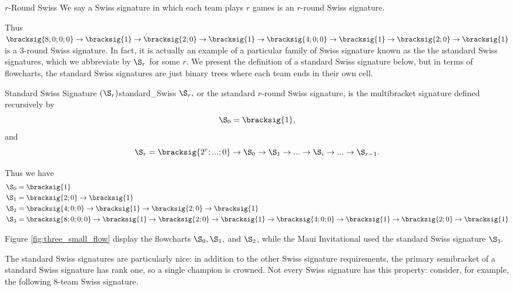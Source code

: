 {    \begin{definition}{$r$-Round Swiss}{}
        We say a Swiss signature in which each team plays $r$ games is an $r$-round Swiss signature.
    \end{definition}
    
    Thus $\bracksig{8;0;0;0} \to \bracksig{1} \to \bracksig{2;0} \to \bracksig{1} \to \bracksig{4;0;0} \to \bracksig{1} \to \bracksig{2;0} \to \bracksig{1}$ is a $3$-round Swiss signature. In fact, it is actually an example of a particular family of Swiss signature known as the the \i{standard Swiss signatures}, which we abbreviate by $\S_r$ for some $r$. We present the definition of a standard Swiss signature below, but in terms of flowcharts, the standard Swiss signatures are just binary trees where each team ends in their own cell.

    \begin{definition}{Standard Swiss Signature $(\S_r)$}{standard_Swiss}
        $\S_r,$ or the \i{standard $r$-round Swiss signature}, is the multibracket signature defined recursively by $$\S_0 = \bracksig{1},$$ and
        $$\S_r = \bracksig{2^r; ...; 0} \to \S_{0} \to \S_1 \to ... \to \S_i \to ... \to \S_{r-1}.$$
    \end{definition}

    Thus we have
    \begin{align*}
        \S_0 =\; &\bracksig{1}\\
        \S_1 =\; &\bracksig{2;0} \to \bracksig{1}\\
        \S_2 =\; &\bracksig{4;0;0} \to \bracksig{1} \to \bracksig{2;0} \to \bracksig{1}\\
        \S_3 =\; &\bracksig{8;0;0;0} \to \bracksig{1} \to \bracksig{2;0} \to \bracksig{1} \to \bracksig{4;0;0} \to \bracksig{1} \to \bracksig{2;0} \to \bracksig{1}
    \end{align*}

    Figure \ref{fig:three_small_flow} display the flowcharts $\S_0, \S_1,$ and $\S_2$, while the Maui Invitational used the standard Swiss signature $\S_3.$


    The standard Swiss signatures are particularly nice: in addition to the other Swiss signature requirements, the primary semibracket of a standard Swiss signature has rank one, so a single champion is crowned. Not every Swiss signature has this property: consider, for example, the following 8-team Swiss signature.

}
